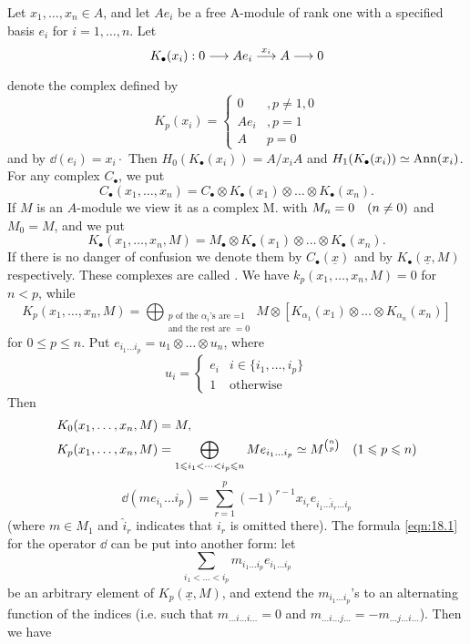 \documentclass[../main]{subfiles}
\begin{document}
Let $x_{1}, \dots, x_{n} \in A$, and let $A e_{i}$ be a free A-module of rank one with a specified basis $e_{i}$ for $i=1, \dots, n$. Let 
\[K_{\bullet}(x_{i}): 0 \varrightarrow{} A e_{i} \varrightarrow{x_i} A \varrightarrow{} 0\]
denote the complex defined by
\[K_p(x_i) = \begin{cases} 0 &, p\neq 1,0 \\ Ae_i &, p=1\\ A & p=0\end{cases}\]
and by $\dd(e_{i})=x_{i} \cdot$ Then $H_{0}(K_{\bullet}(x_{i}))=A / x_{i} A$ and $H_{1}(K_{\bullet}(x_{i})) \simeq \operatorname{Ann}(x_{i})$. For any complex $C_\bullet$, we put \[C_\bullet(x_{1}, \dots, x_{n})=C_\bullet \otimes K_\bullet(x_{1}) \otimes \dots \otimes K_\bullet(x_{n}).\] 
If $M$ is an $A$-module we view it as a complex M. with $M_{n}=0\for{n \neq 0}$ and $M_{0}=M$, and we put \[K_{\bullet}(x_{1}, \dots, x_{n}, M)=M_\bullet \otimes K_\bullet(x_{1}) \otimes \dots \otimes K_\bullet(x_{n}).\] If there is no danger of confusion we denote them by $C_\bullet(\underline{x})$ and by $K_\bullet (\underline{x}, M)$ respectively. These complexes are called . We have $k_{p}(x_{1}, \dots, x_{n}, M)=0$ for $n<p$, while
\[
K_{p}(x_{1}, \dots, x_{n}, M)= \bigoplus_{\substack{p \text{ of the } \alpha_i\text{'s are =1}\\ \text{and the rest are }=0}} M\otimes [K_{\alpha_1}(x_1)\otimes \dots \otimes K_{\alpha_n} (x_n)]
\]
for $0 \leqslant p \leqslant n$. Put $e_{i_{1} \dots i_{p}}=u_{1} \otimes \dots \otimes u_{n}$, where \[u_i =\begin{cases}e_i & i\in \{i_1,\dots , i_p\}\\ 1&\text{otherwise}\end{cases}\] Then
\[\begin{aligned}
K_{0}(x_{1}, \dots, x_{n}, M)&=M,\\
K_p(x_1,\dots,x_n,M) &= \bigoplus_{1\leq i_1<\dots<i_p\leq n} Me_{i_1\dots i_p} \simeq M^{\binom{n}{p}} \for{1\leq p\leq n}
\end{aligned}\]
\[\tag{18.1}\label{eqn:18.1}\dd(m e_{i_{1}} \dots i_{p})=\sum_{r=1}^{p}(-1)^{r-1} x_{i_{r}} e_{i_{1} \dots \hat{i}_{r} \dots i_{p}}\]
(where $m \in M_{1}$ and $\hat{i}_{r}$ indicates that $i_{r}$ is omitted there).
The formula \ref{eqn:18.1} for the operator $\dd$ can be put into another
form: let \[\sum_{ i_{1}<\dots<i_{p} }m_{i_1 \dots i_{p}} e_{i_{1} \dots i_{p}}\] be an arbitrary
element of $K_{p}(\underline{x}, M)$, and extend the $m_{i_{1} \dots i_{p}}$'s to an alternating function of the indices (i.e. such that $m_{\dots i \dots i\dots }=0$
and $m_{\dots i \dots j \dots}=-m_{\dots j \dots i \dots}$). Then we have
\end{document}
